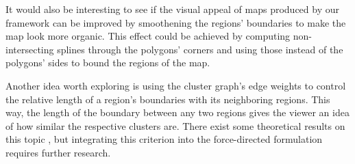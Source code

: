 It would also be interesting to see if the visual appeal of maps produced by our framework can be improved by smoothening the regions' boundaries to make the map look more organic.
This effect could be achieved by computing non-intersecting splines through the polygons' corners and using those instead of the polygons' sides to bound the regions of the map.

Another idea worth exploring is using the cluster graph's edge weights to control the relative length of a region's boundaries with its neighboring regions.
This way, the length of the boundary between any two regions gives the viewer an idea of how similar the respective clusters are.
There exist some theoretical results on this topic \cite{nollenburg2012edge}, but integrating this criterion into the force-directed formulation requires further research.
